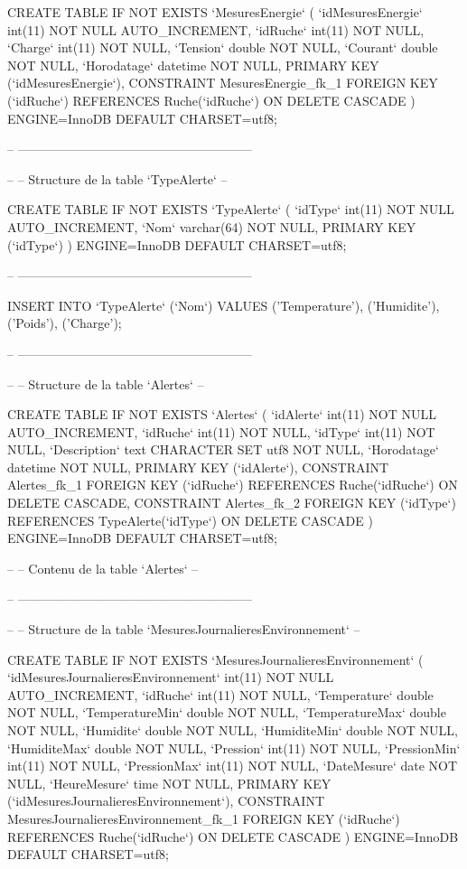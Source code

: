 \begin{DoxyCode}
CREATE TABLE IF NOT EXISTS `MesuresEnergie` (
  `idMesuresEnergie` int(11) NOT NULL AUTO\_INCREMENT, 
  `idRuche` int(11) NOT NULL,
  `Charge` int(11) NOT NULL,
  `Tension` double NOT NULL,
  `Courant` double NOT NULL,
  `Horodatage` datetime NOT NULL,
  PRIMARY KEY (`idMesuresEnergie`),
  CONSTRAINT MesuresEnergie\_fk\_1 FOREIGN KEY (`idRuche`) REFERENCES Ruche(`idRuche`) ON DELETE CASCADE
) ENGINE=InnoDB DEFAULT CHARSET=utf8;

-- --------------------------------------------------------

--
-- Structure de la table `TypeAlerte`
--

CREATE TABLE IF NOT EXISTS `TypeAlerte` (
  `idType` int(11) NOT NULL AUTO\_INCREMENT,
  `Nom` varchar(64) NOT NULL,
  PRIMARY KEY (`idType`)
) ENGINE=InnoDB DEFAULT CHARSET=utf8;

-- --------------------------------------------------------

INSERT INTO `TypeAlerte` (`Nom`) VALUES
('Temperature'),
('Humidite'),
('Poids'),
('Charge');

-- --------------------------------------------------------

--
-- Structure de la table `Alertes`
--

CREATE TABLE IF NOT EXISTS `Alertes` (
  `idAlerte` int(11) NOT NULL AUTO\_INCREMENT,
  `idRuche` int(11) NOT NULL,
  `idType` int(11) NOT NULL,  
  `Description` text CHARACTER SET utf8 NOT NULL,
  `Horodatage` datetime NOT NULL,
  PRIMARY KEY (`idAlerte`),
  CONSTRAINT Alertes\_fk\_1 FOREIGN KEY (`idRuche`) REFERENCES Ruche(`idRuche`) ON DELETE CASCADE,
  CONSTRAINT Alertes\_fk\_2 FOREIGN KEY (`idType`) REFERENCES TypeAlerte(`idType`) ON DELETE CASCADE
) ENGINE=InnoDB DEFAULT CHARSET=utf8;

--
-- Contenu de la table `Alertes`
--

-- --------------------------------------------------------

--
-- Structure de la table `MesuresJournalieresEnvironnement`
--

CREATE TABLE IF NOT EXISTS `MesuresJournalieresEnvironnement` (
  `idMesuresJournalieresEnvironnement` int(11) NOT NULL AUTO\_INCREMENT,
  `idRuche` int(11) NOT NULL,
  `Temperature` double NOT NULL,
  `TemperatureMin` double NOT NULL,
  `TemperatureMax` double NOT NULL,
  `Humidite` double NOT NULL,
  `HumiditeMin` double NOT NULL,
  `HumiditeMax` double NOT NULL,
  `Pression` int(11) NOT NULL,
  `PressionMin` int(11) NOT NULL,
  `PressionMax` int(11) NOT NULL,
  `DateMesure` date NOT NULL,
  `HeureMesure` time NOT NULL,
  PRIMARY KEY (`idMesuresJournalieresEnvironnement`),
  CONSTRAINT MesuresJournalieresEnvironnement\_fk\_1 FOREIGN KEY (`idRuche`) REFERENCES Ruche(`idRuche`) ON
       DELETE CASCADE
) ENGINE=InnoDB DEFAULT CHARSET=utf8;


\end{DoxyCode}
